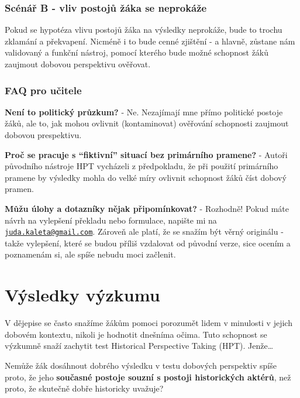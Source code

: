 \documentclass[
  12pt,
  english,
  a4paper,
  extrafontsizes,onecolumn,openright
  ]{memoir}
\begin{document}
\subsubsection{Scénář B - vliv postojů žáka se neprokáže}\label{scuxe9nuxe1ux159-b---vliv-postojux16f-ux17euxe1ka-se-neprokuxe1ux17ee}

Pokud se hypotéza vlivu postojů žáka na výsledky neprokáže, bude to trochu zklamání a překvapení. Nicméně i to bude cenné zjištění - a hlavně, zůstane nám validovaný a funkční nástroj, pomocí kterého bude možné schopnost žáků zaujmout dobovou perspektivu ověřovat.

\subsubsection{FAQ pro učitele}\label{faq-pro-uux10ditele}

\textbf{Není to politický průzkum?} - Ne. Nezajímají mne přímo politické postoje žáků, ale to, jak mohou ovlivnit (kontaminovat) ověřování schopnosti zaujmout dobovou prespektivu.

\textbf{Proč se pracuje s \enquote{fiktivní} situací bez primárního pramene?} - Autoři původního nástroje HPT vycházeli z předpokladu, že při použití primárního pramene by výsledky mohla do velké míry ovlivnit schopnost žáků číst dobový pramen.

\textbf{Můžu úlohy a dotazníky nějak připomínkovat?} - Rozhodně! Pokud máte návrh na vylepšení překladu nebo formulace, napište mi na \href{mailto:juda.kaleta@gmail.com}{\nolinkurl{juda.kaleta@gmail.com}}. Zároveň ale platí, že se snažím být věrný originálu - takže vylepšení, které se budou příliš vzdalovat od původní verze, sice ocením a poznamenám si, ale spíše nebudu moci začlenit.

\section{Výsledky výzkumu}\label{vuxfdsledky-vuxfdzkumu}

V dějepise se často snažíme žákům pomoci porozumět lidem v minulosti v jejich dobovém kontextu, nikoli je hodnotit dnešníma očima. Tuto schopnost se výzkumně snaží zachytit test Historical Perspective Taking (HPT). Jenže\ldots{}

Nemůže žák dosáhnout dobrého výsledku v testu dobových perspektiv spíše proto, že jeho \textbf{současné postoje souzní s postoji historických aktérů}, než proto, že skutečně dobře historicky uvažuje?
\end{document}
